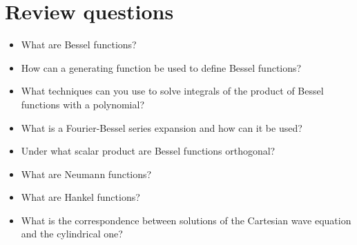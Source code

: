 \section*{Review questions}

\begin{itemize}
\item What are Bessel functions?  
\item How can a generating function be used to define Bessel functions?
\item What techniques can you use to solve integrals of the product of Bessel functions with a polynomial?
\item What is a Fourier-Bessel series expansion and how can it be used?
\item Under what scalar product are Bessel functions orthogonal?
\item What are Neumann functions?
\item What are Hankel functions?
\item What is the correspondence between solutions of the Cartesian wave equation and the cylindrical one?   
\end{itemize}

